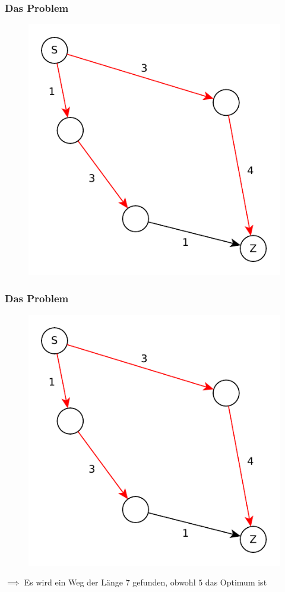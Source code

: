 \begin{frame}
\frametitle{Das Problem}
\begin{figure}
\includegraphics[scale=.8]{dijkstra_graphs/bfs_fail_4.pdf}
\end{figure}
\end{frame}

\begin{frame}
\frametitle{Das Problem}
\begin{figure}
\includegraphics[scale=.8]{dijkstra_graphs/bfs_fail_4.pdf}
\end{figure}

$\implies$ Es wird ein Weg der Länge $7$ gefunden, obwohl $5$ das Optimum ist

\end{frame}

